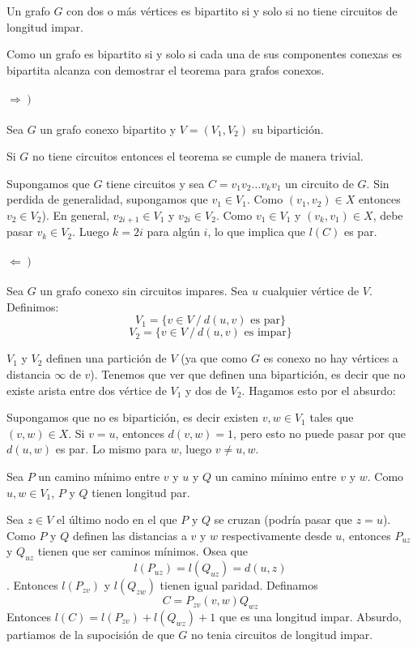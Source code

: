 \begin{theorem}
	Un grafo \(G\) con dos o más vértices es bipartito si y solo si no tiene circuitos de longitud impar.
\end{theorem}
\begin{demo}
	Como un grafo es bipartito si y solo si cada una de sus componentes conexas es bipartita alcanza con demostrar el teorema para grafos conexos.
	\paragraph{\(\left.\Rightarrow\right) \)} Sea \(G\) un grafo conexo bipartito y \(V = (V_1,V_2)\) su bipartición.

	Si \(G\) no tiene circuitos entonces el teorema se cumple de manera trivial.

	Supongamos que \(G\) tiene circuitos y sea \(C = v_1v_2\dots v_kv_1\) un circuito de \(G\). Sin perdida de generalidad, supongamos que \(v_1\in V_1\). Como \((v_1,v_2) \in X\) entonces \(v_2\in V_2\)). En general, \(v_{2i + 1}\in V_1\) y \(v_{2i}\in V_2\). Como \(v_1\in V_1\) y \((v_k,v_1)\in X\), debe pasar \(v_k\in V_2\). Luego \(k = 2i\) para algún \(i\), lo que implica que \(l(C)\) es par.
\end{demo}
\begin{demoPart}

	\paragraph{\(\left.\Leftarrow\right)\)} Sea \(G\) un grafo conexo sin circuitos impares. Sea \(u\) cualquier vértice de \(V\). Definimos: \[V_1 = \{ v\in V~/~d(u,v) \text{ es par}\}\] \[V_2 = \{ v\in V~/~d(u,v) \text{ es impar}\}\]

	\(V_1\) y \(V_2\) definen una partición de \(V\) (ya que como \(G\) es conexo no hay vértices a distancia \(\infty\) de \(v\)). Tenemos que ver que definen una bipartición, es decir que no existe arista entre dos vértice de \(V_1\) y dos de \(V_2\). Hagamos esto por el absurdo:

	Supongamos que no es bipartición, es decir existen \(v,w\in V_1\) tales que \((v,w)\in X\). Si \(v = u\), entonces \(d(v,w) = 1\), pero esto no puede pasar por que \(d(u,w) \) es par. Lo mismo para \(w\), luego \(v\neq u,w\).

	Sea \(P\) un camino mínimo entre \(v\) y \(u\) y \(Q\) un camino mínimo entre \(v\) y \(w\). Como \(u,w\in V_1\), \(P\) y \(Q\) tienen longitud par.

	Sea \(z\in V\) el último nodo en el que \(P\) y \(Q\) se cruzan (podría pasar que \(z = u\)). Como \(P\) y \(Q\) definen las distancias a \(v\) y \(w\) respectivamente desde \(u\), entonces \(P_{uz}\) y \(Q_{uz}\) tienen que ser caminos mínimos. Osea que \[l(P_{uz}) = l(Q_{uz}) = d(u,z)\].
	Entonces \(l(P_{zv})\) y \(l(Q_{zw})\) tienen igual paridad. Definamos \[C = P_{zv}(v,w)Q_{wz}\]
	Entonces \(l(C) = l(P_{zv}) + l(Q_{wz}) + 1\) que es una longitud impar. Absurdo, partiamos de la supocisión de que \(G\) no tenia circuitos de longitud impar.
\end{demoPart}

